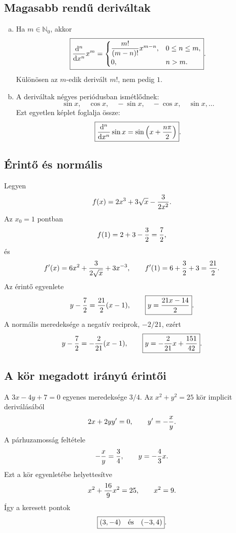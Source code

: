 \documentclass{szb-solution}
\begin{document}
\subsection{Magasabb rendű deriváltak}

\begin{enumerate}[a)]
  \item Ha $m\in\mathbb N_0$, akkor
        $$
          \boxed{
          \frac{\mathrm d^n}{\mathrm dx^n}x^m=
          \begin{cases}
            \dfrac{m!}{(m-n)!}x^{m-n},&0\leq n\leq m,\\
            0,&n>m.
          \end{cases}}
          \text.
        $$
        Különösen az $m$-edik derivált $m!$, nem pedig $1$.

  \item A deriváltak négyes periódusban ismétlődnek:
        $$
          \sin x,\quad\cos x,\quad-\sin x,\quad-\cos x,\quad\sin x,\dots
        $$
        Ezt egyetlen képlet foglalja össze:
        $$
          \boxed{\displaystyle
          \frac{\mathrm d^n}{\mathrm dx^n}\sin x
          =\sin\left(x+\frac{n\pi}{2}\right)}
          \text.
        $$
\end{enumerate}

\subsection{Érintő és normális}

Legyen
$$
  f(x)=2x^3+3\sqrt x-\frac{3}{2x^2}
  \text.
$$
Az $x_0=1$ pontban
$$
  f(1)=2+3-\frac32=\frac72
  \text,
$$
és
$$
  f'(x)=6x^2+\frac{3}{2\sqrt x}+3x^{-3},
  \qquad
  f'(1)=6+\frac32+3=\frac{21}{2}
  \text.
$$
Az érintő egyenlete
$$
  y-\frac72=\frac{21}{2}(x-1),
  \qquad
  \boxed{y=\frac{21x-14}{2}}
  \text.
$$
A normális meredeksége a negatív reciprok, $-2/21$, ezért
$$
  y-\frac72=-\frac2{21}(x-1),
  \qquad
  \boxed{y=-\frac2{21}x+\frac{151}{42}}
  \text.
$$

\clearpage
\subsection{A kör megadott irányú érintői}

A $3x-4y+7=0$ egyenes meredeksége $3/4$. Az
$x^2+y^2=25$ kör implicit deriválásából
$$
  2x+2yy'=0,
  \qquad y'=-\frac{x}{y}
  \text.
$$
A párhuzamosság feltétele
$$
  -\frac{x}{y}=\frac34,
  \qquad y=-\frac43x
  \text.
$$
Ezt a kör egyenletébe helyettesítve
$$
  x^2+\frac{16}{9}x^2=25,
  \qquad x^2=9
  \text.
$$
Így a keresett pontok
$$
  \boxed{(3,-4)\quad\text{és}\quad(-3,4)}
  \text.
$$
\end{document}
